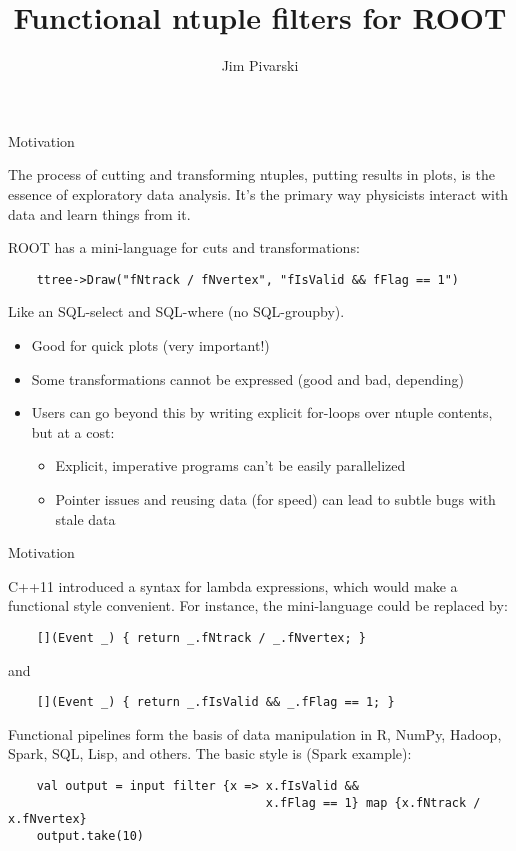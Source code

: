 \documentclass{beamer}
\title{Functional ntuple filters for ROOT}
\author{Jim Pivarski}
\begin{document}
\begin{frame}
  \titlepage
\end{frame}

\begin{frame}[fragile]{Motivation}

\begin{block}{}
The process of cutting and transforming ntuples, putting results in plots, is the essence of exploratory data analysis. It's the primary way physicists interact with data and learn things from it.
\end{block}

\begin{block}{}
ROOT has a mini-language for cuts and transformations:
{\scriptsize \begin{verbatim}
    ttree->Draw("fNtrack / fNvertex", "fIsValid && fFlag == 1")
\end{verbatim}}
Like an SQL-select and SQL-where (no SQL-groupby).
\end{block}

\begin{itemize}
\item Good for quick plots (very important!)
\item Some transformations cannot be expressed (good and bad, depending)
\item Users can go beyond this by writing explicit for-loops over ntuple contents, but at a cost:
\begin{itemize}
\item Explicit, imperative programs can't be easily parallelized
\item Pointer issues and reusing data (for speed) can lead to subtle bugs with stale data
\end{itemize}
\end{itemize}
\end{frame}

\begin{frame}[fragile]{Motivation}
\begin{block}{}
C++11 introduced a syntax for lambda expressions, which would make a functional style convenient. For instance, the mini-language could be replaced by:
{\scriptsize \begin{verbatim}
    [](Event _) { return _.fNtrack / _.fNvertex; }
\end{verbatim}}
and
{\scriptsize \begin{verbatim}
    [](Event _) { return _.fIsValid && _.fFlag == 1; }
\end{verbatim}}
\end{block}

\begin{block}{}
Functional pipelines form the basis of data manipulation in R, NumPy, Hadoop, Spark, SQL, Lisp, and others. The basic style is (Spark example):
{\scriptsize \begin{verbatim}
    val output = input filter {x => x.fIsValid &&
                                    x.fFlag == 1} map {x.fNtrack / x.fNvertex}
    output.take(10)
\end{verbatim}}


\end{block}




\end{frame}
\end{document}
